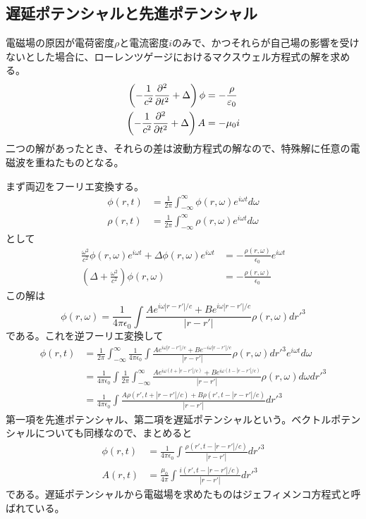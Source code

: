 \subsection{遅延ポテンシャルと先進ポテンシャル}
    電磁場の原因が電荷密度$\rho$と電流密度$i$のみで、かつそれらが自己場の影響を受けないとした場合に、ローレンツゲージにおけるマクスウェル方程式の解を求める。
    \begin{align*}
        \left(-\frac{1}{c^2}\pd[^2]{t^2} + \Delta\right)\phi &= -\frac{\rho}{\epsilon_0}\\
        \left(-\frac{1}{c^2}\pd[^2]{t^2} + \Delta\right)A &= -\mu_0 i
    \end{align*}
    二つの解があったとき、それらの差は波動方程式の解なので、特殊解に任意の電磁波を重ねたものとなる。

    まず両辺をフーリエ変換する。
    \begin{align*}
        \phi(r, t) &= \frac{1}{2\pi}\int_{-\infty}^{\infty} \phi(r, \omega)e^{i\omega t}d\omega\\
        \rho(r, t) &= \frac{1}{2\pi}\int_{-\infty}^{\infty} \rho(r, \omega)e^{i\omega t}d\omega
    \end{align*}
    として
    \begin{align*}
        \frac{\omega^2}{c^2}\phi(r, \omega)e^{i\omega t} + \Delta \phi(r, \omega)e^{i\omega t} &= -\frac{\rho(r, \omega)}{\epsilon_0}e^{i\omega t}\\
        \left(\Delta + \frac{\omega^2}{c^2}\right)\phi(r, \omega) &= -\frac{\rho(r, \omega)}{\epsilon_0}
    \end{align*}
    この解は
        \[\phi(r, \omega) = \frac{1}{4\pi\epsilon_0}\int \frac{Ae^{i\omega|r - r'|/c} + Be^{i\omega|r - r'|/c}}{|r - r'|}\rho(r, \omega)dr'^3\]
    である。これを逆フーリエ変換して
    \begin{align*}
        \phi(r, t)
        &= \frac{1}{2\pi}\int_{-\infty}^{\infty} \frac{1}{4\pi\epsilon_0}\int \frac{Ae^{i\omega|r - r'|/c} + Be^{-i\omega|r - r'|/c}}{|r - r'|}\rho(r, \omega)dr'^3 e^{i\omega t}d\omega\\
        &= \frac{1}{4\pi\epsilon_0}\int \frac{1}{2\pi}\int_{-\infty}^{\infty} \frac{Ae^{i\omega(t + |r - r'|/c)} + Be^{i\omega(t - |r - r'|/c)}}{|r - r'|}\rho(r, \omega) d\omega dr'^3\\
        &= \frac{1}{4\pi\epsilon_0}\int \frac{A\rho(r', t + |r - r'|/c) + B\rho(r', t - |r - r'|/c)}{|r - r'|} dr'^3
    \end{align*}
    第一項を先進ポテンシャル、第二項を遅延ポテンシャルという。ベクトルポテンシャルについても同様なので、まとめると
    \begin{align*}
        \phi(r, t) &= \frac{1}{4\pi\epsilon_0}\int \frac{\rho(r', t - |r - r'|/c)}{|r - r'|} dr'^3\\
        A(r, t) &= \frac{\mu_0}{4\pi}\int \frac{i(r', t - |r - r'|/c)}{|r - r'|} dr'^3
    \end{align*}
    である。遅延ポテンシャルから電磁場を求めたものはジェフィメンコ方程式と呼ばれている。

